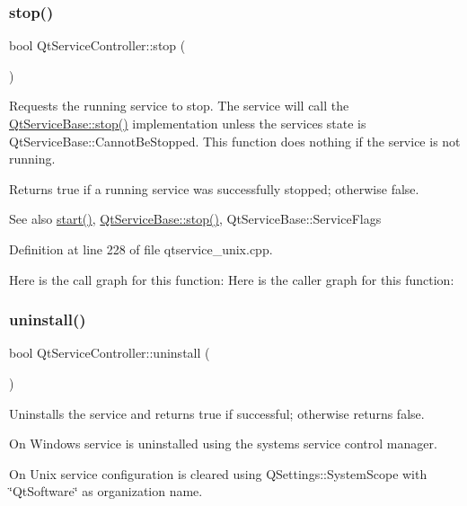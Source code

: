 \subsubsection{\texorpdfstring{stop()}{stop()}}
{\footnotesize\ttfamily bool Qt\+Service\+Controller\+::stop (\begin{DoxyParamCaption}{ }\end{DoxyParamCaption})}

Requests the running service to stop. The service will call the \mbox{\hyperlink{class_qt_service_base_a8d52c1b8fd06b50bdc0a0c6f9936a68e}{Qt\+Service\+Base\+::stop()}} implementation unless the service\textquotesingle{}s state is Qt\+Service\+Base\+::\+Cannot\+Be\+Stopped. This function does nothing if the service is not running.

Returns true if a running service was successfully stopped; otherwise false.

\begin{DoxySeeAlso}{See also}
\mbox{\hyperlink{class_qt_service_controller_a5e9d6da5081d70f31611456d0ef0687e}{start()}}, \mbox{\hyperlink{class_qt_service_base_a8d52c1b8fd06b50bdc0a0c6f9936a68e}{Qt\+Service\+Base\+::stop()}}, Qt\+Service\+Base\+::\+Service\+Flags 
\end{DoxySeeAlso}


Definition at line 228 of file qtservice\+\_\+unix.\+cpp.

Here is the call graph for this function\+:
Here is the caller graph for this function\+:
\mbox{\label{class_qt_service_controller_a25cd2f1f6868ece5de77976eb55cb74c}} 
\subsubsection{\texorpdfstring{uninstall()}{uninstall()}}
{\footnotesize\ttfamily bool Qt\+Service\+Controller\+::uninstall (\begin{DoxyParamCaption}{ }\end{DoxyParamCaption})}

Uninstalls the service and returns true if successful; otherwise returns false.

On Windows service is uninstalled using the system\textquotesingle{}s service control manager.

On Unix service configuration is cleared using Q\+Settings\+::\+System\+Scope with \char`\"{}\+Qt\+Software\char`\"{} as organization name.

